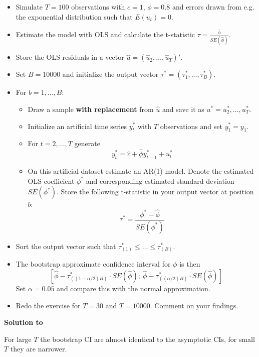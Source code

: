 \documentclass[a4paper]{scrartcl}
\begin{document}
\begin{itemize}
	\item Simulate $T=100$ observations with $c=1$, $\phi=0.8$ and errors drawn from e.g. the exponential distribution such that $E(u_t)=0$.
	\item Estimate the model with OLS and calculate the t-statistic $\tau=\frac{\hat{\phi}}{SE(\hat{\phi})}$. 
	\item Store the OLS residuals in a vector $\hat{u} = (\hat{u}_{2},\ldots ,\hat{u}_{T})'$.
	\item Set $B=10000$ and initialize the output vector $\tau^{\ast} = (\tau_1^\ast,...,\tau_B^\ast)$. \item For $b=1,...,B$:
	\begin{itemize}
		\item Draw a sample \textbf{with replacement} from $\hat{u}$ and save it as $u^{\ast} = u_{2}^{\ast},\ldots ,u_{T}^{\ast }$.
		\item Initialize an artificial time series $y_t^\ast$ with $T$ observations and set $y_1^\ast = y_1$.
		\item For $t=2,\ldots ,T$ generate
		\begin{equation*}
		y_{t}^{\ast }=\hat{c}+\hat{\phi}y^\ast_{t-1}+u_{t}^{\ast }
		\end{equation*}
		\item On this artificial dataset estimate an AR(1) model. Denote the estimated OLS coefficient $\phi^\ast$ and corresponding estimated standard deviation $SE(\phi^\ast)$. Store the following t-statistic in your output vector at position $b$:
		$$\tau^\ast = \frac{\phi^\ast - \hat{\phi}}{SE(\phi^\ast)}$$
	\end{itemize}
	\item Sort the output vector such that $\tau_{(1)}^\ast \leq ... \leq \tau_{(B)}^\ast$.
	\item  The bootstrap approximate confidence interval for $\phi$ is then
	\begin{equation*}
	\left[ \hat{\phi}-\tau_{((1-\alpha /2)B)}^{\ast }\cdot SE(\hat{\phi});\ \hat{\phi}-\tau_{((\alpha/2)B)}^{\ast }\cdot SE(\hat{\phi})\right] 
	\end{equation*}
	Set $\alpha=0.05$ and compare this with the normal approximation.
	\item Redo the exercise for $T=30$ and $T=10000$. Comment on your findings.
\end{itemize}
\begin{solution}\textbf{Solution to }
	
	For large $T$ the bootstrap CI are almost identical to the asymptotic CIs, for small $T$ they are narrower.
\newpage %
\end{solution}
\newpage
\fi %
\end{document}
